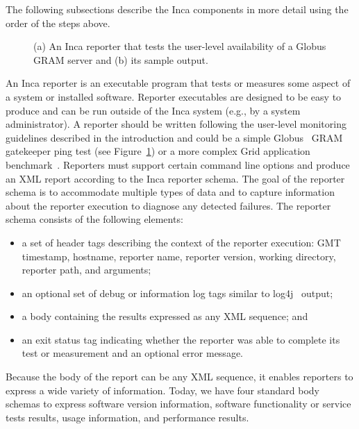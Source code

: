 \documentclass[times,10pt,twocolumn]{article}
\begin{document}
\noindent The following subsections describe the Inca components in more
detail using the order of the steps above.


\lstset{
  basicstyle=\scriptsize\ttfamily, 
  frame=single,
  keywordstyle=\textbf, 
  identifierstyle=, 
  commentstyle=\scriptsize\ttfamily, 
  stringstyle=\ttfamily, 
  numbers=left, 
  numberstyle=\scriptsize,
  stepnumber=2,
  firstnumber=1,
  showstringspaces=false} 
\begin{figure}
\lstset{language=Perl} 
\subfigure[]{}
\subfigure[]{}
\caption{\label{pingReporter}(a) An Inca reporter that tests the user-level
availability of a Globus GRAM server and (b) its sample output.}
\end{figure}

An Inca reporter is an executable program that tests or measures some aspect
of a system or installed software.   Reporter executables are designed to be
easy to produce and can be run outside of the Inca system (e.g., by a system
administrator).  A reporter should be written following the user-level
monitoring guidelines described in the introduction and could be a simple
Globus~\cite{globus} GRAM gatekeeper ping test (see Figure~\ref{pingReporter})
or a more complex Grid application benchmark~\cite{grasp}.  Reporters must
support certain command line options and produce an XML report according to
the Inca reporter schema.  The goal of the reporter schema is to accommodate
multiple types of data and to capture information about the reporter
execution to diagnose any detected failures.  The reporter schema consists of
the following elements: 

\begin{itemize}
\item a set of header tags describing the context of the reporter
execution:  GMT timestamp, hostname, reporter name, reporter version, working
directory, reporter path, and arguments;
\item an optional set of debug or information log tags similar to log4j~\cite{log4j} output;
\item a body containing the results expressed as any XML sequence; and
\item an exit status tag
indicating whether the reporter was able to complete its test or measurement
and an optional error message.  
\end{itemize} 
\noindent Because the body of the report can be any XML sequence, it enables
reporters to express a wide variety of information.  Today, we have four
standard body schemas to express software version information, software
functionality or service tests results, usage information, and performance
results.  
\end{document}
